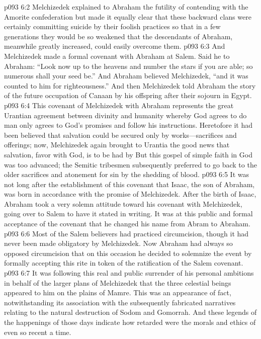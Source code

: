 \vs p093 6:2 Melchizedek explained to Abraham the futility of contending with the Amorite confederation but made it equally clear that these backward clans were certainly committing suicide by their foolish practices so that in a few generations they would be so weakened that the descendants of Abraham, meanwhile greatly increased, could easily overcome them.
\vs p093 6:3 And Melchizedek made a formal covenant with Abraham at Salem. Said he to Abraham: “Look now up to the heavens and number the stars if you are able; so numerous shall your seed be.” And Abraham believed Melchizedek, “and it was counted to him for righteousness.” And then Melchizedek told Abraham the story of the future occupation of Canaan by his offspring after their sojourn in Egypt.
\pc \vs p093 6:4 This covenant of Melchizedek with Abraham represents the great Urantian agreement between divinity and humanity whereby God agrees to do  man only agrees to  God’s promises and follow his instructions. Heretofore it had been believed that salvation could be secured only by works---sacrifices and offerings; now, Melchizedek again brought to Urantia the good news that salvation, favor with God, is to be had by  But this gospel of simple faith in God was too advanced; the Semitic tribesmen subsequently preferred to go back to the older sacrifices and atonement for sin by the shedding of blood.
\vs p093 6:5 It was not long after the establishment of this covenant that Isaac, the son of Abraham, was born in accordance with the promise of Melchizedek. After the birth of Isaac, Abraham took a very solemn attitude toward his covenant with Melchizedek, going over to Salem to have it stated in writing. It was at this public and formal acceptance of the covenant that he changed his name from Abram to Abraham.
\vs p093 6:6 Most of the Salem believers had practiced circumcision, though it had never been made obligatory by Melchizedek. Now Abraham had always so opposed circumcision that on this occasion he decided to solemnize the event by formally accepting this rite in token of the ratification of the Salem covenant.
\vs p093 6:7 It was following this real and public surrender of his personal ambitions in behalf of the larger plans of Melchizedek that the three celestial beings appeared to him on the plains of Mamre. This was an appearance of fact, notwithstanding its association with the subsequently fabricated narratives relating to the natural destruction of Sodom and Gomorrah. And these legends of the happenings of those days indicate how retarded were the morals and ethics of even so recent a time.
